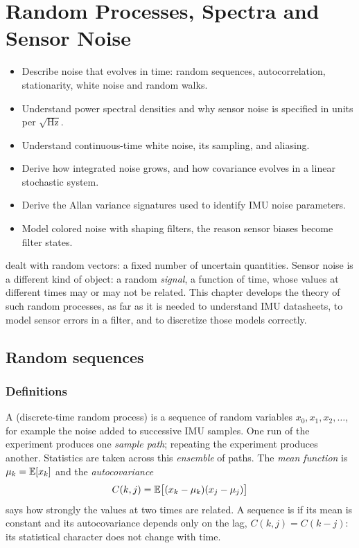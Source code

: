 \chapter{Random Processes, Spectra and Sensor Noise}
\label{ch:processes}

\begin{objectives}
\begin{itemize}
  \item Describe noise that evolves in time: random sequences, autocorrelation, stationarity, white noise and random walks.
  \item Understand power spectral densities and why sensor noise is specified in units per $\sqrt{\mathrm{Hz}}$.
  \item Understand continuous-time white noise, its sampling, and aliasing.
  \item Derive how integrated noise grows, and how covariance evolves in a linear stochastic system.
  \item Derive the Allan variance signatures used to identify IMU noise parameters.
  \item Model colored noise with shaping filters, the reason sensor biases become filter states.
\end{itemize}
\end{objectives}

 dealt with random vectors: a fixed number of uncertain quantities. Sensor noise is a different kind of object: a random
\emph{signal}, a function of time, whose values at different times may or may not be related. This chapter develops the theory of such
random processes, as far as it is needed to understand IMU datasheets, to model sensor errors in a filter, and to discretize those models
correctly.

\section{Random sequences}

\subsection{Definitions}

A  (discrete-time random process) is a sequence of random variables $x_0, x_1, x_2, \dots$, for example the noise
added to successive IMU samples. One run of the experiment produces one \emph{sample path}; repeating the experiment produces another.
Statistics are taken across this \emph{ensemble} of paths. The \emph{mean function} is $\mu_k = \mathbb{E}[x_k]$ and the \emph{autocovariance}
\begin{equation}
  C(k, j) = \mathbb{E}\big[(x_k - \mu_k)(x_j - \mu_j)\big]
\end{equation}
says how strongly the values at two times are related. A sequence is  if its mean is constant and its
autocovariance depends only on the lag, $C(k, j) = C(k - j)$: its statistical character does not change with time.

